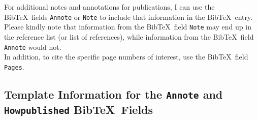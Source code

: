 \documentclass[letter,12pt]{article}
\begin{document}
For additional notes and annotations for publications, I can use the {\sc Bib}\TeX\ fields {\tt Annote} or {\tt Note} to include that information in the {\sc Bib}\TeX\ entry. Please kindly note that information from the {\sc Bib}\TeX\ field {\tt Note} may end up in the reference list (or list of references), while information from the {\sc Bib}\TeX\ field {\tt Annote} would not. \\

In addition, to cite the specific page numbers of interest, use the {\sc Bib}\TeX\ field {\tt Pages}.













\subsection{Template Information for the {\tt Annote} and {\tt Howpublished} {\sc Bib}\TeX\ Fields}
\label{ssec:TemplateInformationForTheAnnoteBibTeXField}
\end{document}
